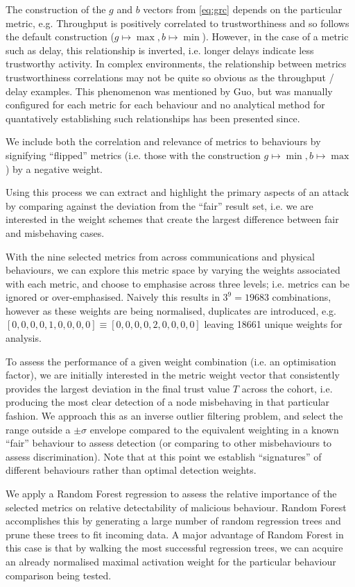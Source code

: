 \documentclass{aamas2016}
\begin{document}
The construction of the $g$ and $b$ vectors from \ref{eq:grc} depends on the particular metric, e.g. Throughput is positively correlated to trustworthiness and so follows the default construction ($g \mapsto \max, b \mapsto \min$).
However, in the case of a metric such as delay, this relationship is inverted, i.e. longer delays indicate less trustworthy activity.
In complex environments, the relationship between metrics trustworthiness correlations may not be quite so obvious as the throughput / delay examples.
This phenomenon was mentioned by Guo, but was manually configured for each metric for each behaviour and no analytical method for quantatively establishing such relationships has been presented since.

We include both the correlation and relevance of metrics to behaviours by signifying ``flipped'' metrics (i.e. those with the construction $g \mapsto \min, b \mapsto \max$) by a negative weight.

Using this process we can extract and highlight the primary aspects of an attack by comparing against the deviation from the ``fair'' result set, i.e. we are interested in the weight schemes that create the largest difference between fair and misbehaving cases.

With the nine selected metrics from across communications and physical behaviours, we can explore this metric space by varying the weights associated with each metric, and choose to emphasise across three levels; i.e. metrics can be ignored or over-emphasised. Naively this results in $3^9 = 19683$ combinations, however as these weights are being normalised, duplicates are introduced, e.g. $[0,0,0,0,1,0,0,0,0] \equiv [0,0,0,0,2,0,0,0,0]$ leaving 18661 unique weights for analysis.

To assess the performance of a given weight combination (i.e. an optimisation factor), we are initially interested in the metric weight vector that consistently provides the largest deviation in the final trust value $T$ across the cohort, i.e. producing the most clear detection of a node misbehaving in that particular fashion.
We approach this as an inverse outlier filtering problem, and select the range outside a $\pm\sigma$ envelope compared to the equivalent weighting in a known ``fair'' behaviour to assess detection (or comparing to other misbehaviours to assess discrimination). Note that at this point we establish ``signatures'' of different behaviours rather than optimal detection weights.

We apply a Random Forest regression \cite{Breiman2001} to assess the relative importance of the selected metrics on relative detectability of malicious behaviour. 
Random Forest accomplishes this by generating a large number of random regression trees and prune these trees to fit incoming data. A major advantage of Random Forest in this case is that by walking the most successful regression trees, we can acquire an already normalised maximal activation weight for the particular behaviour comparison being tested.
\end{document}
